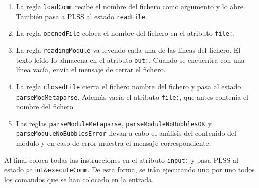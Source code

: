 \begin{enumerate}
\item La regla \texttt{loadComm} recibe el nombre del fichero como argumento y lo abre. También pasa a PLSS al estado \texttt{readFile}.
\item La regla \texttt{openedFile} coloca el nombre del fichero en el atributo \texttt{file:}.
\item La regla \texttt{readingModule} va leyendo cada una de las líneas del fichero.
El texto leído lo almacena en el atributo \texttt{out:}.
Cuando se encuentra con una línea vacía, envía el mensaje de cerrar el fichero. 
\item La regla \texttt{closedFile} cierra el fichero nombre del fichero y pasa al estado \texttt{parseModMetaparse}. 
Además vacía el atributo \texttt{file:}, que antes contenía el nombre del fichero.
\item Las reglas \texttt{parseModuleMetaparse}, \texttt{parseModuleNoBubblesOK} y \texttt{parseModuleNoBubblesError} llevan a cabo el análisis del contenido del módulo y en caso de error muestra el mensaje correspondiente.
\end{enumerate}
\smallskip

Al final coloca todas las instrucciones en el atributo \texttt{input:} y pasa PLSS al estado \texttt{print\&executeComm}.
De esta forma, se irán ejecutando uno por uno todos los comandos que se han colocado en la entrada.
\medskip

